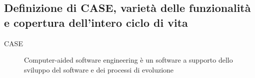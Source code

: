 \subsection{Definizione di CASE, varietà delle funzionalità e copertura dell’intero ciclo di vita}
\begin{description}
    \item[CASE] Computer-aided software engineering è un software a supporto dello sviluppo del software e dei processi di evoluzione
\end{description}